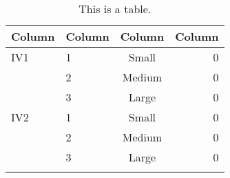 \begin{table}[htp!]
  \begin{center}
    \caption{This is a table.}
    \label{tab:table1}
    \footnotesize
    \begin{tabular}{llcr}
      \textbf{Column} & \textbf{Column} & \textbf{Column} & \textbf{Column}\\      
      \hline
      \addlinespace[1ex]
      IV1
      & 1 & Small  & 0 \\
      & 2 & Medium & 0 \\
      & 3 & Large  & 0  \\
      IV2
      & 1 & Small  & 0 \\
      & 2 & Medium & 0 \\
      & 3 & Large  & 0 \\
      \addlinespace[1ex]
      \hline
    \end{tabular}
  \end{center}
\end{table}